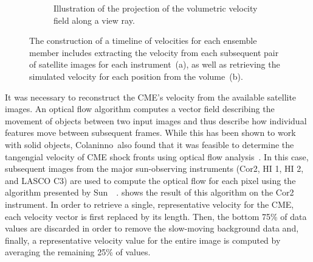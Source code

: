 \begin{figure}
\begin{subfigure}[b]{0.32\textwidth}
    \caption{Illustration of the projection of the volumetric velocity field along a view ray.}
    \label{contributions:astro:spaceweather:velocity:simulation}
\end{subfigure}
\caption{The construction of a timeline of velocities for each ensemble member includes extracting the velocity from each subsequent pair of satellite images for each instrument~(a), as well as retrieving the simulated velocity for each position from the volume~(b).}
\label{contributions:astro:spaceweather:velocity}
\end{figure}

It was necessary to reconstruct the CME's velocity from the available satellite images.  An optical flow algorithm computes a vector field describing the movement of objects between two input images and thus describe how individual features move between subsequent frames.  While this has been shown to work with solid objects, Colaninno~\etal also found that it was feasible to determine the tangengial velocity of CME shock fronts using optical flow analysis~\cite{colaninno2006analysis}.  In this case, subsequent images from the major sun-observing instruments (Cor2, HI 1, HI 2, and LASCO C3) are used to compute the optical flow for each pixel using the algorithm presented by Sun~\etal ~\cite{sun2010secrets}.  shows the result of this algorithm on the Cor2 instrument.  In order to retrieve a single, representative velocity for the CME, each velocity vector is first replaced by its length.  Then, the bottom 75\% of data values are discarded in order to remove the slow-moving background data and, finally, a representative velocity value for the entire image is computed by averaging the remaining 25\% of values.

